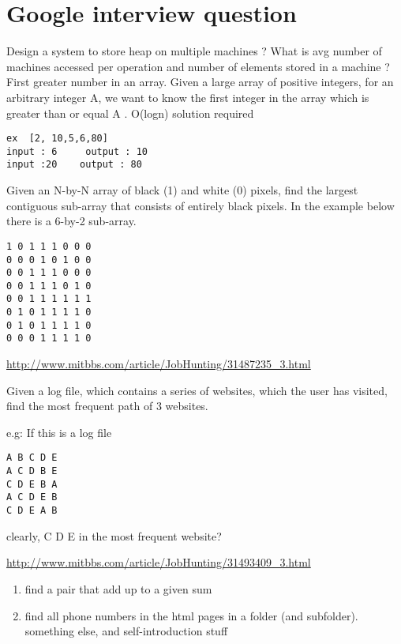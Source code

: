 \documentclass[12pt]{book}
\begin{document}
\chapter{Google interview question}
\label{sec-15}
Design a system to store heap on multiple machines ? What is avg number of 
machines accessed per operation and  number of elements stored in a machine ?
First greater number in an array. Given a large array of positive integers, 
for an arbitrary integer A, we want to know the first integer in the array 
which is greater than or equal A . O(logn) solution required
\lstset{language=java,label= ,caption= ,numbers=none}
\begin{lstlisting}
ex  [2, 10,5,6,80]
input : 6     output : 10
input :20    output : 80
\end{lstlisting}

Given an N-by-N array of black (1) and white (0) pixels, find the largest 
contiguous sub-array that consists of entirely black pixels. In the example 
below there is a 6-by-2 sub-array.

\lstset{language=java,label= ,caption= ,numbers=none}
\begin{lstlisting}
1 0 1 1 1 0 0 0
0 0 0 1 0 1 0 0
0 0 1 1 1 0 0 0
0 0 1 1 1 0 1 0
0 0 1 1 1 1 1 1
0 1 0 1 1 1 1 0
0 1 0 1 1 1 1 0
0 0 0 1 1 1 1 0
\end{lstlisting}

\url{http://www.mitbbs.com/article/JobHunting/31487235_3.html}

Given a log file, which contains a series of websites, which the user has 
visited, find the most frequent path of 3 websites.

e.g: If this is a log file
\lstset{language=java,label= ,caption= ,numbers=none}
\begin{lstlisting}
A B C D E
A C D B E
C D E B A
A C D E B
C D E A B
\end{lstlisting}

clearly, C D E in the most frequent website?

\url{http://www.mitbbs.com/article/JobHunting/31493409_3.html}

\begin{enumerate}
\item find a pair that add up to a given sum

\item find all phone numbers in the html pages in a folder (and subfolder). something else, and self-introduction stuff
\end{enumerate}
\end{document}

